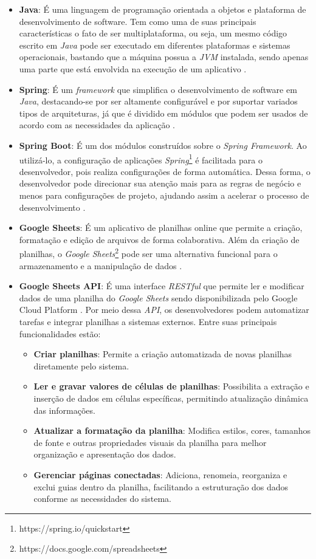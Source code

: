 \begin{itemize}
    \item \textbf{Java}: É uma linguagem de programação orientada a objetos e plataforma de desenvolvimento de software. Tem como uma de suas principais características o fato de ser multiplataforma, ou seja, um mesmo código escrito em \textit{Java} pode ser executado em diferentes plataformas e sistemas operacionais, bastando que a máquina possua a \textit{JVM} instalada, sendo apenas uma parte que está envolvida na execução de um aplicativo \cite{Java2025}.
    \item \textbf{Spring}: É um \textit{framework} que simplifica o desenvolvimento de software em \textit{Java}, destacando-se por ser altamente configurável e por suportar variados tipos de arquiteturas, já que é dividido em módulos que podem ser usados de acordo com as necessidades da aplicação \cite{Spring2025}.
    \item \textbf{Spring Boot}: É um dos módulos construídos sobre o \textit{Spring Framework}. Ao utilizá-lo, a configuração de aplicações \textit{Spring}\footnote{https://spring.io/quickstart} é facilitada para o desenvolvedor, pois realiza configurações de forma automática. Dessa forma, o desenvolvedor pode direcionar sua atenção mais para as regras de negócio e menos para configurações de projeto, ajudando assim a acelerar o processo de desenvolvimento \cite{SpringBoot2025}.
    \item \textbf{Google Sheets}: É um aplicativo de planilhas online que permite a criação, formatação e edição de arquivos de forma colaborativa. Além da criação de planilhas, o \textit{Google Sheets}\footnote{https://docs.google.com/spreadsheets} pode ser uma alternativa funcional para o armazenamento e a manipulação de dados \cite{ufsm2024}.
    \item \textbf{Google Sheets API}: É uma interface \textit{RESTful} que permite ler e modificar dados de uma planilha do \textit{Google Sheets} sendo disponibilizada pelo Google Cloud Platform \cite{apisheets2025}. Por meio dessa \textit{API}, os desenvolvedores podem automatizar tarefas e integrar planilhas a sistemas externos. Entre suas principais funcionalidades estão:

    \begin{itemize}
        \item \textbf{Criar planilhas}: Permite a criação automatizada de novas planilhas diretamente pelo sistema.
        \item \textbf{Ler e gravar valores de células de planilhas}: Possibilita a extração e inserção de dados em células específicas, permitindo atualização dinâmica das informações.
        \item \textbf{Atualizar a formatação da planilha}: Modifica estilos, cores, tamanhos de fonte e outras propriedades visuais da planilha para melhor organização e apresentação dos dados.
        \item \textbf{Gerenciar páginas conectadas}: Adiciona, renomeia, reorganiza e exclui guias dentro da planilha, facilitando a estruturação dos dados conforme as necessidades do sistema.
    \end{itemize}


\end{itemize}

